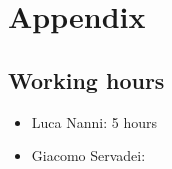 \section{Appendix}
\subsection{Working hours}
\begin{itemize}
	\item Luca Nanni: 5 hours
	\item Giacomo Servadei: 
\end{itemize}
